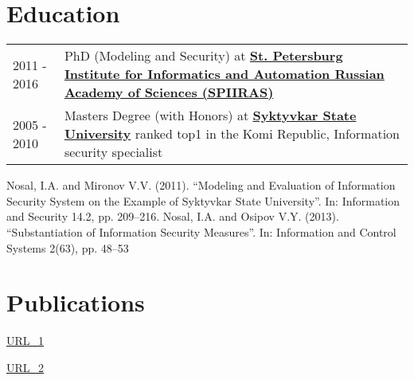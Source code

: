 \documentclass[a4paper,12pt]{article}
\begin{document}
\section{Education}
\begin{tabularx}{\linewidth}{@{}l X@{}}
2011 - 2016 & PhD (Modeling and Security) at \textbf{\href{http://www.spiiras.nw.ru/en/}{St. Petersburg Institute for Informatics and Automation Russian Academy of Sciences (SPIIRAS)}} \\

2005 - 2010 & Masters Degree (with Honors) at \textbf{\href{https://en.syktsu.ru/}{Syktyvkar State University}} ranked top1 in the Komi Republic, Information security specialist \hfill  \\
\end{tabularx}

Nosal, I.A. and Mironov V.V. (2011). “Modeling and Evaluation of Information Security System on the
Example of Syktyvkar State University”. In: Information and Security 14.2, pp. 209–216.
Nosal, I.A. and Osipov V.Y. (2013). “Substantiation of Information Security Measures”. In: Information
and Control Systems 2(63), pp. 48–53


\section{Publications}

\begin{refsection}
\nocite{nosal2011modeling}
\printbibliography[heading=none]
\end{refsection}
\href{https://scholar.google.com/citations?view_op=view_citation&hl=ru&user=g1m_ATEAAAAJ&citation_for_view=g1m_ATEAAAAJ:d1gkVwhDpl0C}{URL_1}

\begin{refsection}
\nocite{nosal2013substantiation}
\printbibliography[heading=none]
\end{refsection}

\href{https://www.researchgate.net/publication/260185876_Substantiation_of_Information_Security_Measure}{URL_2}


\end{document}
